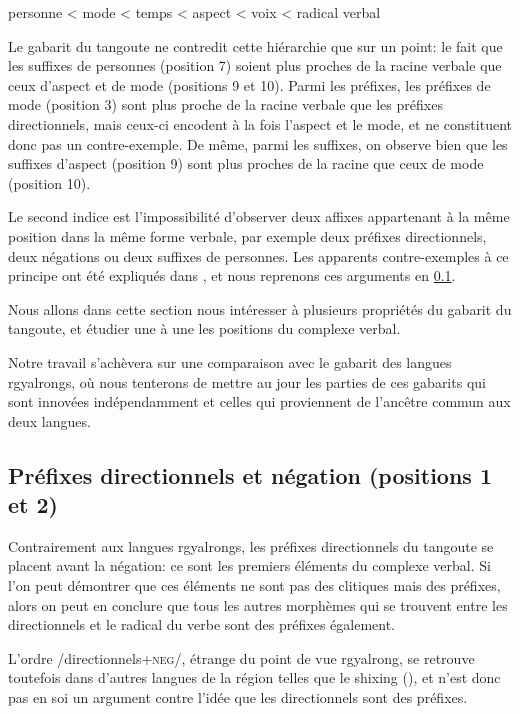 \documentclass[oldfontcommands,twoside,a4paper,11pt,draft]{memoir}
\newcommand{\negat}{\textsc{neg}}
\begin{document}
\begin{exe}
\ex  \label{bybee}
personne < mode  < temps < aspect < voix < radical verbal
\end{exe}
Le gabarit du tangoute ne contredit cette hiérarchie que sur un point: le fait que les suffixes de personnes (position 7) soient plus proches de la racine verbale que ceux d'aspect et de mode (positions 9 et 10). Parmi les préfixes, les préfixes de mode (position 3) sont plus proche de la racine verbale que les préfixes directionnels, mais ceux-ci encodent à la fois l'aspect et le mode, et ne constituent donc pas un contre-exemple. De même, parmi les suffixes, on observe bien que les suffixes d'aspect (position 9) sont plus proches de la racine que ceux de mode (position 10).


  
  Le second indice est l'impossibilité d'observer deux affixes appartenant à la même position dans la même forme verbale, par exemple deux préfixes directionnels, deux négations ou deux suffixes de personnes. Les apparents contre-exemples à ce principe ont été expliqués dans \citet{jacques11tangut.verb}, et nous reprenons ces arguments en \ref{subsec:direct-ordre}.
 
 Nous allons dans cette section nous intéresser à plusieurs propriétés du gabarit du tangoute, et étudier une à une les positions du complexe verbal.
 
  Notre travail s'achèvera sur une comparaison avec le gabarit des langues rgyalrongs, où nous tenterons de mettre au jour les parties de ces gabarits qui sont innovées indépendamment et celles qui proviennent de l'ancêtre commun aux deux langues.
  
 
\subsection{Préfixes directionnels et négation (positions 1 et 2)} \label{subsec:direct-ordre}
Contrairement aux langues rgyalrongs, les préfixes directionnels du tangoute se placent avant la négation: ce sont les premiers éléments du complexe verbal. Si l'on peut démontrer que ces éléments ne sont pas des clitiques mais des préfixes, alors on peut en conclure que tous les autres morphèmes qui se trouvent entre les directionnels et le radical du verbe sont des préfixes également.

L'ordre /directionnels+\negat{}/, étrange du point de vue rgyalrong, se retrouve toutefois dans d'autres langues de la région telles que le shixing (\citealt{chirkova09grammar}), et n'est donc pas en soi un argument contre l'idée que les directionnels sont des préfixes.
\end{document}
